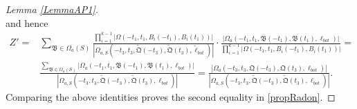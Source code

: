 \begin{proof}[Lemma \ref{LemmaAP1}]
\[	\]
	and hence
	\begin{equation*}
		\begin{split}
			Z' =&\sum_{\mathfrak{B}\in \Omega_a(S)}\frac{\prod_{i = 1}^{k-1}|\Omega(-t_1,t_1,B_i(-t_1),B_i(t_1))|}{|\Omega_{a,S}(-t_3,t_3,\tilde{\mathfrak{Q}}(-t_3),\tilde{\mathfrak{Q}}(t_3),\tilde\ell_{bot})|}\cdot\frac{|\Omega_a(-t_1,t_1,\mathfrak B(-t_1),\mathfrak{B}(t_1),\ell_{bot})|}{\prod_{i = 1}^{k-1}|\Omega(-t_1,t_1, B_i(-t_1),B_i(t_1))|}=\\ 
			&\frac{\sum_{\mathfrak{B}\in\Omega_a(S)}|\Omega_a(-t_1,t_1,\mathfrak B(-t_1),\mathfrak B(t_1),\ell_{bot})|}{|\Omega_{a,S}(-t_3,t_3,\tilde{\mathfrak{Q}}(-t_3),\tilde{\mathfrak{Q}}(t_3),\ell_{bot})|} = \frac{|\Omega_a(-t_3,t_3,{\mathfrak{Q}}(-t_3),{\mathfrak{Q}}(t_3),\ell_{bot})|}{|\Omega_{a,S}(-t_3,t_3,\tilde{\mathfrak{Q}}(-t_3),\tilde{\mathfrak{Q}}(t_3),\ell_{bot})|}.
		\end{split}
	\end{equation*}
	Comparing the above identities proves the second equality in \eqref{propRadon}.
	

\end{proof}
